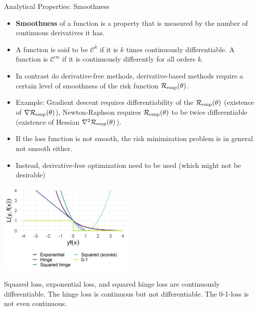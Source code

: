 \begin{vbframe}{Analytical Properties: Smoothness}

\begin{itemize}
    \item \textbf{Smoothness} of a function is a property that is measured by the number of continuous derivatives it has. 
    \item A function is said to be $\mathcal{C}^k$ if it is $k$ times continuously differentiable. A function is $\mathcal{C}^\infty$ if it is continuously differently for all orders $k$. 
    \item In contrast do derivative-free methods, derivative-based methods require a certain level of smoothness of the risk function $\mathcal{R}_{\text{emp}}(\theta)$. 
    \item Example: Gradient descent requires differentiability of the $\mathcal{R}_{\text{emp}}(\theta)$ (existence of $\nabla \mathcal{R}_{\text{emp}}(\theta)$), Newton-Raphson requires $\mathcal{R}_{\text{emp}}(\theta)$ to be twice differentiable (existence of Hessian $\nabla^2 \mathcal{R}_{\text{emp}}(\theta)$). 

    \framebreak 

    \item If the loss function is not smooth, the risk minimization problem is in general not smooth either. 
    \item  Instead, derivative-free optimization need to be used (which might not be desirable)
\end{itemize}

\begin{center}
  \includegraphics[width = 0.5\textwidth]{figure/plot_loss_overview_classif.png} \\
  \begin{footnotesize}
    Squared loss, exponential loss, and squared hinge loss are continuously differentiable. The hinge loss is continuous but not differentiable. The 0-1-loss is not even continuous.   
  \end{footnotesize}
\end{center}



\end{vbframe}


